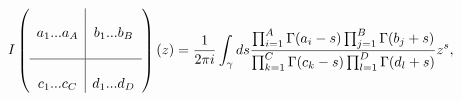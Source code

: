 \begin{equation}
I\left(\begin{array}{c|c}\\
a_1...a_A & b_1...b_B\\
& \\ \hline
& \\
c_1...c_C & d_1...d_D\\
\end{array}\right)(z)={1\over2\pi i}\int_\gamma ds {\prod_{i=1}^A\Gamma(a_i-s)\prod_{j=1}^B
\Gamma(b_j+s)\over\prod_{k=1}^C\Gamma(c_k-s)\prod_{l=1}^D\Gamma(d_l+s)}z^s,
\end{equation}

